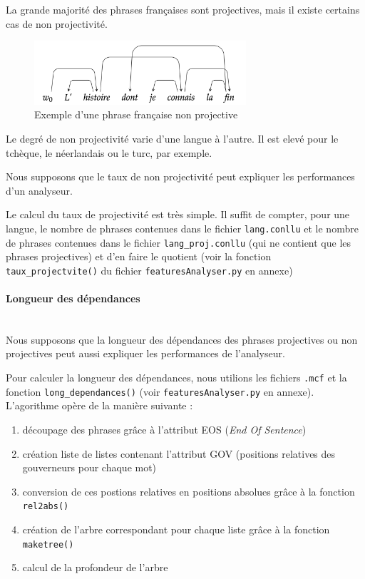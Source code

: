 \documentclass[a4paper, twoside, 12pt]{article}
\newcommand{\myparagraph}[1]{\paragraph{#1}\mbox{}\\}
\begin{document}
    La grande majorité des phrases françaises sont projectives, mais il existe certains cas de non projectivité.

    \begin{figure}[!h]
        \centering
        \includegraphics[width = 0.7\textwidth]{images/nonprojectivite}
        \caption{Exemple d'une phrase française non projective}
        \label{fig:nonprojectiv}
    \end{figure}

    Le degré de non projectivité varie d'une langue à l'autre. Il est elevé pour le tchèque, le néerlandais ou le turc, par exemple.

    Nous supposons que le taux de non projectivité peut expliquer les performances d'un analyseur.

    Le calcul du taux de projectivité est très simple. Il suffit de compter, pour une langue, le nombre de phrases contenues dans le fichier \texttt{lang.conllu} et le nombre de phrases contenues dans le fichier \texttt{lang\_proj.conllu} (qui ne contient que les phrases projectives) et d'en faire le quotient (voir la fonction \texttt{taux\_projectvite()} du fichier \texttt{featuresAnalyser.py} en annexe)

\myparagraph{Longueur des dépendances}

    Nous supposons que la longueur des dépendances des phrases projectives ou non projectives peut aussi expliquer les performances de l'analyseur.

Pour calculer la longueur des dépendances, nous utilions les fichiers \texttt{.mcf} et la fonction \texttt{long\_dependances()} (voir \texttt{featuresAnalyser.py} en annexe). L'agorithme opère de la manière suivante :
    \begin{enumerate}
        \item découpage des phrases grâce à l'attribut EOS (\textit{End Of Sentence})
        \item création liste de listes contenant l'attribut GOV (positions relatives des gouverneurs pour chaque mot)
        \item conversion de ces postions relatives en positions absolues grâce à la fonction \texttt{rel2abs()}
        \item création de l'arbre correspondant pour chaque liste grâce à la fonction \texttt{maketree()}
        \item calcul de la profondeur de l'arbre
    \end{enumerate} ~\par
\end{document}

